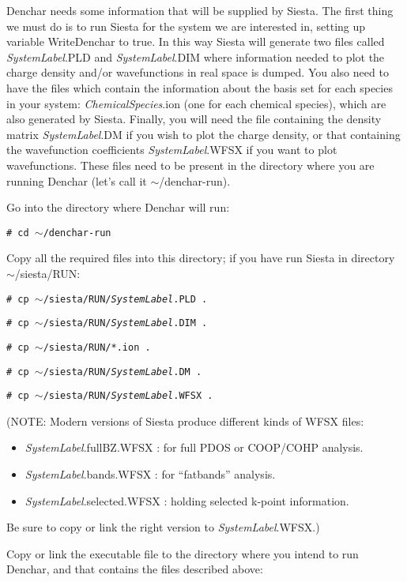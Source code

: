  {\sc Denchar} needs some information that will be supplied by {\sc Siesta}. 
 The first thing we must do is to run {\sc Siesta} for 
 the system we are interested in,
 setting up variable WriteDenchar to true. 
 In this way {\sc Siesta} will generate
 two files called {\it SystemLabel}.PLD and {\it SystemLabel}.DIM
 where information 
 needed to plot the charge density and/or wavefunctions 
 in real space is dumped. You also need to have the files which
 contain the information about the basis set for each species
 in your system: {\it ChemicalSpecies}.ion (one for each
 chemical species), which
 are also generated by  {\sc Siesta}.
 Finally, you will need the file containing the
 density matrix {\it SystemLabel}.DM if you wish to plot
 the charge density, or that containing the wavefunction
 coefficients {\it SystemLabel}.WFSX if you want to plot
 wavefunctions. These files need to be present in the
 directory where you are running {\sc Denchar} (let's call it
 $\sim$/denchar-run).

 Go into the directory where {\sc Denchar} will run:

 {\tt \# cd $\sim$/denchar-run}

 Copy all the required files into this directory; if you
 have run {\sc Siesta} in directory $\sim$/siesta/RUN:

 {\tt \# cp $\sim$/siesta/RUN/{\it SystemLabel}.PLD .}

 {\tt \# cp $\sim$/siesta/RUN/{\it SystemLabel}.DIM .}

 {\tt \# cp $\sim$/siesta/RUN/*.ion .}

 {\tt \# cp $\sim$/siesta/RUN/{\it SystemLabel}.DM .}

 {\tt \# cp $\sim$/siesta/RUN/{\it SystemLabel}.WFSX .}

(NOTE: Modern versions of {\sc Siesta} produce different kinds
of WFSX files: 
\begin{itemize}
\item {\it SystemLabel}.fullBZ.WFSX : for full PDOS or COOP/COHP
  analysis.
\item {\it SystemLabel}.bands.WFSX : for ``fatbands'' analysis.
\item {\it SystemLabel}.selected.WFSX : holding selected k-point information.
\end{itemize}
Be sure to copy or link the right version to  {\it SystemLabel}.WFSX.)

 Copy or link the executable file to the directory
 where you intend to run  {\sc Denchar}, and that
 contains the files described above:


